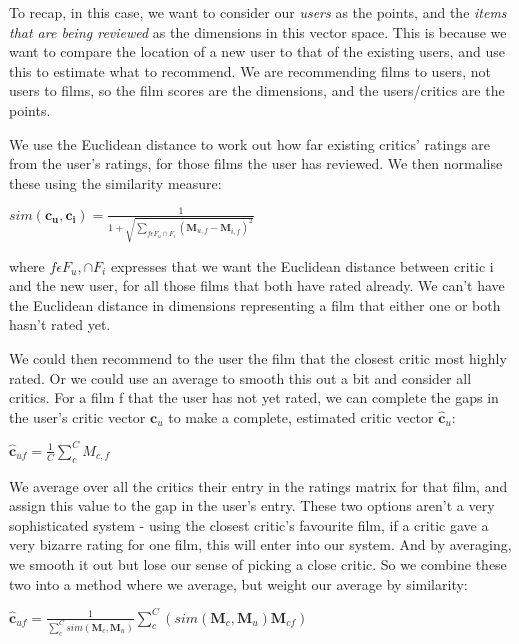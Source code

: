 \documentclass[10pt,a4paper]{article}
\newcommand{\bh}[1]{\bm{\hat{#1}}}
\begin{document}
			To recap, in this case, we want to consider our \textit{users} as the points, and the \textit{items that are being reviewed} as the dimensions in this vector space. This is because we want to compare the location of a new user to that of the existing users, and use this to estimate what to recommend. We are recommending films to users, not users to films, so the film scores are the dimensions, and the users/critics are the points. 
			
			We use the Euclidean distance to work out how far existing critics' ratings are from the user's ratings, for those films the user has reviewed. We then normalise these using the similarity measure:
			
			\begin{center}
				$sim(\bm{c_u}, \bm{c_i}) = \frac{1}{1 + \sqrt{\sum\limits_{f\epsilon F_u \cap F_i} (\bm M_{u,f} - \bm M_{i,f})^2}} $
			\end{center}
			where $f\epsilon F_u, \cap F_i$ expresses that we want the Euclidean distance between critic i and the new user, for all those films that both have rated already. We can't have the Euclidean distance in dimensions representing a film that either one or both hasn't rated yet.
 
			
			We could then recommend to the user the film that the closest critic most highly rated. Or we could use an average to smooth this out a bit and consider all critics.  For a film f that the user has not yet rated, we can complete the gaps in the user's critic vector $\bm c_u$ to make a complete, estimated critic vector $\bh c_u$:
			
			\begin{center}
				$
				\bh c_{uf} = \frac{1}{C}\sum\limits_c^C M_{c,f}
				$
			\end{center}
			We average over all the critics their entry in the ratings matrix for that film, and assign this value to the gap in the user's entry.
			 These two options aren't a very sophisticated system - using the closest critic's favourite film, if a critic gave a very bizarre rating for one film, this will enter into our system. And by averaging, we smooth it out but lose our sense of picking a close critic. So we combine these two into a method where we average, but weight our average by similarity:
			 
			 \begin{center}
			 	$\bh c_{uf} = \frac{1}{\sum\limits_c^C sim(\bm M_c, \bm M_u)}\sum\limits_c^C(sim(\bm M_c, \bm M_u)\bm M_{cf})	$
			 \end{center}
			 
\end{document}
